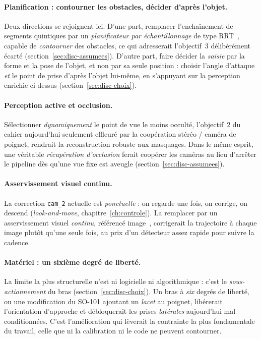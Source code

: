 \paragraph{Planification : contourner les obstacles, décider d'après l'objet.}
Deux directions se rejoignent ici. D'une part, remplacer l'enchaînement de segments quintiques par un \emph{planificateur par échantillonnage} de type RRT~\cite{lavalle_planning_2006}, capable de \emph{contourner} des obstacles, ce qui adresserait l'objectif~3 délibérément écarté (section~\ref{sec:disc-assumees}). D'autre part, faire décider la \emph{saisie} par la forme et la pose de l'objet, et non par sa seule position : choisir l'angle d'attaque \emph{et} le point de prise d'après l'objet lui-même, en s'appuyant sur la perception enrichie ci-dessus (section~\ref{sec:disc-choix}).

\paragraph{Perception active et occlusion.}
Sélectionner \emph{dynamiquement} le point de vue le moins occulté, l'objectif~2 du cahier aujourd'hui seulement effleuré par la coopération stéréo / caméra de poignet, rendrait la reconstruction robuste aux masquages. Dans le même esprit, une véritable \emph{récupération d'occlusion} ferait coopérer les caméras au lieu d'arrêter le pipeline dès qu'une vue fixe est aveugle (section~\ref{sec:disc-assumees}).

\paragraph{Asservissement visuel continu.}
La correction \texttt{cam\_2} actuelle est \emph{ponctuelle} : on regarde une fois, on corrige, on descend (\emph{look-and-move}, chapitre~\ref{ch:controle}). La remplacer par un asservissement visuel \emph{continu}, référencé image~\cite{chaumette_visual_2006}, corrigerait la trajectoire à chaque image plutôt qu'une seule fois, au prix d'un détecteur assez rapide pour suivre la cadence.

\paragraph{Matériel : un sixième degré de liberté.}
La limite la plus structurelle n'est ni logicielle ni algorithmique : c'est le \emph{sous-actionnement} du bras (section~\ref{sec:disc-choix}). Un bras à \emph{six} degrés de liberté, ou une modification du SO-101 ajoutant un \emph{lacet} au poignet, libérerait l'orientation d'approche et débloquerait les prises \emph{latérales} aujourd'hui mal conditionnées. C'est l'amélioration qui lèverait la contrainte la plus fondamentale du travail, celle que ni la calibration ni le code ne peuvent contourner.

